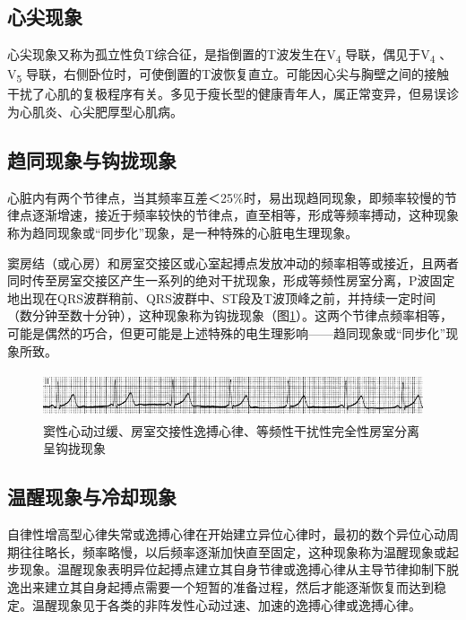 \protect\hypertarget{text00047.htmlux5cux23subid523}{}{}

\subsection{心尖现象}

心尖现象又称为孤立性负T综合征，是指倒置的T波发生在V\textsubscript{4}
导联，偶见于V\textsubscript{4} 、V\textsubscript{5}
导联，右侧卧位时，可使倒置的T波恢复直立。可能因心尖与胸壁之间的接触干扰了心肌的复极程序有关。多见于瘦长型的健康青年人，属正常变异，但易误诊为心肌炎、心尖肥厚型心肌病。

\protect\hypertarget{text00047.htmlux5cux23subid524}{}{}

\subsection{趋同现象与钩拢现象}

心脏内有两个节律点，当其频率互差＜25\%时，易出现趋同现象，即频率较慢的节律点逐渐增速，接近于频率较快的节律点，直至相等，形成等频率搏动，这种现象称为趋同现象或“同步化”现象，是一种特殊的心脏电生理现象。

窦房结（或心房）和房室交接区或心室起搏点发放冲动的频率相等或接近，且两者同时传至房室交接区产生一系列的绝对干扰现象，形成等频性房室分离，P波固定地出现在QRS波群稍前、QRS波群中、ST段及T波顶峰之前，并持续一定时间（数分钟至数十分钟），这种现象称为钩拢现象（图\ref{fig40-1}）。这两个节律点频率相等，可能是偶然的巧合，但更可能是上述特殊的电生理影响------趋同现象或“同步化”现象所致。

\begin{figure}[!htbp]
 \centering
 \includegraphics[width=5.58333in,height=0.53125in]{./images/Image00662.jpg}
 \captionsetup{justification=centering}
 \caption{窦性心动过缓、房室交接性逸搏心律、等频性干扰性完全性房室分离呈钩拢现象}
 \label{fig40-1}
  \end{figure} 

\protect\hypertarget{text00047.htmlux5cux23subid525}{}{}

\subsection{温醒现象与冷却现象}

自律性增高型心律失常或逸搏心律在开始建立异位心律时，最初的数个异位心动周期往往略长，频率略慢，以后频率逐渐加快直至固定，这种现象称为温醒现象或起步现象。温醒现象表明异位起搏点建立其自身节律或逸搏心律从主导节律抑制下脱逸出来建立其自身起搏点需要一个短暂的准备过程，然后才能逐渐恢复而达到稳定。温醒现象见于各类的非阵发性心动过速、加速的逸搏心律或逸搏心律。

